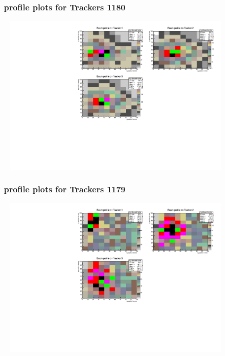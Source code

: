 \documentclass[slidestop,compress,mathserif]{beamer}
\begin{document}
\begin{frame}\frametitle{profile plots for Trackers 1180}
	 \includegraphics[width=12cm,height=8cm]{profile_plots_for_Trackers_1180.pdf}
\end{frame}
\begin{frame}\frametitle{profile plots for Trackers 1179}
	 \includegraphics[width=12cm,height=8cm]{profile_plots_for_Trackers_1179.pdf}
\end{frame}
\end{document}
